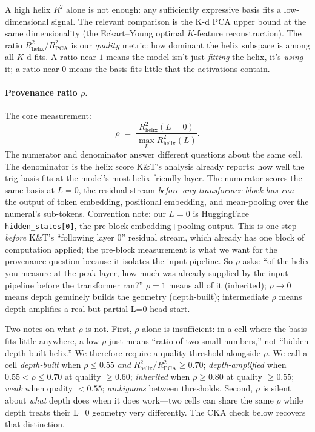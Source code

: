 \documentclass[10pt,letterpaper]{article}
\begin{document}
A high helix $R^2$ alone is not enough: any sufficiently expressive
basis fits a low-dimensional signal. The relevant comparison is the
K-d PCA upper bound at the same dimensionality (the Eckart--Young
optimal $K$-feature reconstruction). The ratio
$R^2_{\mathrm{helix}}/R^2_{\mathrm{PCA}}$ is our \emph{quality}
metric: how dominant the helix subspace is among all $K$-d fits. A
ratio near $1$ means the model isn't just \emph{fitting} the helix,
it's \emph{using} it; a ratio near $0$ means the basis fits little
that the activations contain.

\paragraph{Provenance ratio $\rho$.} The core measurement:
\begin{equation}
\label{eq:rho}
\rho \;=\; \frac{R^2_{\mathrm{helix}}(L\!=\!0)}{\max_L R^2_{\mathrm{helix}}(L)}.
\end{equation}
The numerator and denominator answer different questions about the
same cell. The denominator is the helix score K\&T's analysis
already reports: how well the trig basis fits at the model's most
helix-friendly layer. The numerator scores the same basis at
$L=0$, the residual stream \emph{before any transformer block has
run}---the output of token embedding, positional embedding, and
mean-pooling over the numeral's sub-tokens. Convention note: our
$L=0$ is HuggingFace \texttt{hidden\_states[0]}, the pre-block
embedding+pooling output. This is one step \emph{before} K\&T's
``following layer 0'' residual stream, which already has one block of
computation applied; the pre-block measurement is what we want for
the provenance question because it isolates the input pipeline. So
$\rho$ asks: ``of the helix you measure at the peak layer, how much
was already supplied by the input pipeline before the transformer
ran?'' $\rho = 1$ means
all of it (inherited); $\rho \to 0$ means depth genuinely builds the
geometry (depth-built); intermediate $\rho$ means depth amplifies a
real but partial L=0 head start.

Two notes on what $\rho$ is not. First, $\rho$ alone is insufficient:
in a cell where the basis fits little anywhere, a low $\rho$ just
means ``ratio of two small numbers,'' not ``hidden depth-built helix.''
We therefore require a quality threshold alongside $\rho$. We call a
cell \emph{depth-built} when $\rho \le 0.55$ \emph{and}
$R^2_{\mathrm{helix}}/R^2_{\mathrm{PCA}} \ge 0.70$;
\emph{depth-amplified} when $0.55 < \rho \le 0.70$ at quality $\ge
0.60$; \emph{inherited} when $\rho \ge 0.80$ at quality $\ge 0.55$;
\emph{weak} when quality $< 0.55$; \emph{ambiguous} between
thresholds. Second, $\rho$ is silent about \emph{what} depth does
when it does work---two cells can share the same $\rho$ while depth
treats their L=0 geometry very differently. The CKA check below
recovers that distinction.
\end{document}
